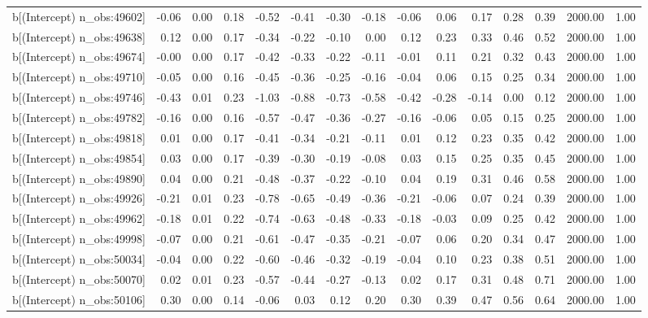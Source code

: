 \begin{table}[ht]
\begin{tabular}{rrrrrrrrrrrrrrr}
  b[(Intercept) n\_obs:49602] & -0.06 & 0.00 & 0.18 & -0.52 & -0.41 & -0.30 & -0.18 & -0.06 & 0.06 & 0.17 & 0.28 & 0.39 & 2000.00 & 1.00 \\ 
  b[(Intercept) n\_obs:49638] & 0.12 & 0.00 & 0.17 & -0.34 & -0.22 & -0.10 & 0.00 & 0.12 & 0.23 & 0.33 & 0.46 & 0.52 & 2000.00 & 1.00 \\ 
  b[(Intercept) n\_obs:49674] & -0.00 & 0.00 & 0.17 & -0.42 & -0.33 & -0.22 & -0.11 & -0.01 & 0.11 & 0.21 & 0.32 & 0.43 & 2000.00 & 1.00 \\ 
  b[(Intercept) n\_obs:49710] & -0.05 & 0.00 & 0.16 & -0.45 & -0.36 & -0.25 & -0.16 & -0.04 & 0.06 & 0.15 & 0.25 & 0.34 & 2000.00 & 1.00 \\ 
  b[(Intercept) n\_obs:49746] & -0.43 & 0.01 & 0.23 & -1.03 & -0.88 & -0.73 & -0.58 & -0.42 & -0.28 & -0.14 & 0.00 & 0.12 & 2000.00 & 1.00 \\ 
  b[(Intercept) n\_obs:49782] & -0.16 & 0.00 & 0.16 & -0.57 & -0.47 & -0.36 & -0.27 & -0.16 & -0.06 & 0.05 & 0.15 & 0.25 & 2000.00 & 1.00 \\ 
  b[(Intercept) n\_obs:49818] & 0.01 & 0.00 & 0.17 & -0.41 & -0.34 & -0.21 & -0.11 & 0.01 & 0.12 & 0.23 & 0.35 & 0.42 & 2000.00 & 1.00 \\ 
  b[(Intercept) n\_obs:49854] & 0.03 & 0.00 & 0.17 & -0.39 & -0.30 & -0.19 & -0.08 & 0.03 & 0.15 & 0.25 & 0.35 & 0.45 & 2000.00 & 1.00 \\ 
  b[(Intercept) n\_obs:49890] & 0.04 & 0.00 & 0.21 & -0.48 & -0.37 & -0.22 & -0.10 & 0.04 & 0.19 & 0.31 & 0.46 & 0.58 & 2000.00 & 1.00 \\ 
  b[(Intercept) n\_obs:49926] & -0.21 & 0.01 & 0.23 & -0.78 & -0.65 & -0.49 & -0.36 & -0.21 & -0.06 & 0.07 & 0.24 & 0.39 & 2000.00 & 1.00 \\ 
  b[(Intercept) n\_obs:49962] & -0.18 & 0.01 & 0.22 & -0.74 & -0.63 & -0.48 & -0.33 & -0.18 & -0.03 & 0.09 & 0.25 & 0.42 & 2000.00 & 1.00 \\ 
  b[(Intercept) n\_obs:49998] & -0.07 & 0.00 & 0.21 & -0.61 & -0.47 & -0.35 & -0.21 & -0.07 & 0.06 & 0.20 & 0.34 & 0.47 & 2000.00 & 1.00 \\ 
  b[(Intercept) n\_obs:50034] & -0.04 & 0.00 & 0.22 & -0.60 & -0.46 & -0.32 & -0.19 & -0.04 & 0.10 & 0.23 & 0.38 & 0.51 & 2000.00 & 1.00 \\ 
  b[(Intercept) n\_obs:50070] & 0.02 & 0.01 & 0.23 & -0.57 & -0.44 & -0.27 & -0.13 & 0.02 & 0.17 & 0.31 & 0.48 & 0.71 & 2000.00 & 1.00 \\ 
  b[(Intercept) n\_obs:50106] & 0.30 & 0.00 & 0.14 & -0.06 & 0.03 & 0.12 & 0.20 & 0.30 & 0.39 & 0.47 & 0.56 & 0.64 & 2000.00 & 1.00 \\ 

\end{tabular}
\end{table}
